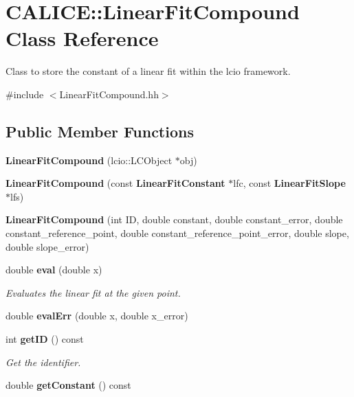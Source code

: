 \section{CALICE::LinearFitCompound Class Reference}
\label{classCALICE_1_1LinearFitCompound}


Class to store the constant of a linear fit within the lcio framework.  


{\ttfamily \#include $<$LinearFitCompound.hh$>$}\subsection*{Public Member Functions}
\begin{DoxyCompactItemize}
\item 
{\bfseries LinearFitCompound} (lcio::LCObject $\ast$obj)\label{classCALICE_1_1LinearFitCompound_aa041bdcd07656d399c777cb69d3df568}

\item 
{\bfseries LinearFitCompound} (const {\bf LinearFitConstant} $\ast$lfc, const {\bf LinearFitSlope} $\ast$lfs)\label{classCALICE_1_1LinearFitCompound_a8f5ac3c81a865ecc10f36e22bdb8e94f}

\item 
{\bfseries LinearFitCompound} (int ID, double constant, double constant\_\-error, double constant\_\-reference\_\-point, double constant\_\-reference\_\-point\_\-error, double slope, double slope\_\-error)\label{classCALICE_1_1LinearFitCompound_aa9bea1b2c7c021daa57dc3542288c1ac}

\item 
double {\bf eval} (double x)
\begin{DoxyCompactList}\small\item\em Evaluates the linear fit at the given point. \item\end{DoxyCompactList}\item 
double {\bfseries evalErr} (double x, double x\_\-error)\label{classCALICE_1_1LinearFitCompound_a78b246859cb94fc056e66b65544f8d65}

\item 
int {\bf getID} () const \label{classCALICE_1_1LinearFitCompound_a9cd94ca37460ca86c74fd4e659f280cc}

\begin{DoxyCompactList}\small\item\em Get the identifier. \item\end{DoxyCompactList}\item 
double {\bf getConstant} () const \label{classCALICE_1_1LinearFitCompound_ac1ca6ec7539fe980fbd67af7769930d3}


\end{DoxyCompactItemize}
